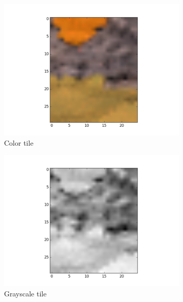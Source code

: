 \documentclass[fleqn,10pt]{SelfArx} %
\begin{document}
\begin{figure}
        \begin{subfigure}[b]{0.3\textwidth}
                \includegraphics[width=\linewidth]{Figures/EdgeFigures/TileColor.png}
                \caption{Color tile}
                \label{fig:ColTile}
        \end{subfigure}%
        \begin{subfigure}[b]{0.3\textwidth}
                \includegraphics[width=\linewidth]{Figures/EdgeFigures/TileGray.png}
                \caption{Grayscale tile}
                \label{fig:GrayTile}
        \end{subfigure}%
        \begin{subfigure}[b]{0.3\textwidth}

\end{subfigure}
\end{figure}
\end{document}
